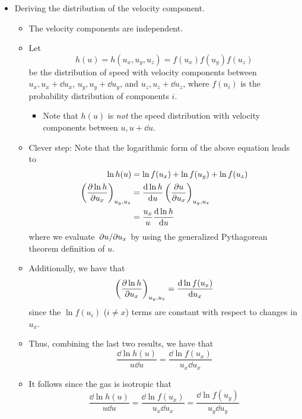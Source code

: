 \documentclass[../notes.tex]{subfiles}
\begin{document}
\begin{itemize}
    \item Deriving the distribution of the velocity component.
    \begin{itemize}
        \item The velocity components are independent.
        \item Let
        \begin{equation*}
            h(u) = h(u_x,u_y,u_z) = f(u_x)f(u_y)f(u_z)
        \end{equation*}
        be the distribution of speed with velocity components between $u_x,u_x+\dd{u_x}$, $u_y,u_y+\dd{u_y}$, and $u_z,u_z+\dd{u_z}$, where $f(u_i)$ is the probability distribution of components $i$.
        \begin{itemize}
            \item Note that $h(u)$ is \emph{not} the speed distribution with velocity components between $u,u+\dd{u}$.
        \end{itemize}
        \item Clever step: Note that the logarithmic form of the above equation leads to
        \begin{align*}
            \ln h(u) &= \ln f(u_x)+\ln f(u_y)+\ln f(u_z)\\
            \left( \pdv{\ln h}{u_x} \right)_{u_y,u_z} &= \dv{\ln h}{u}\left( \pdv{u}{u_x} \right)_{u_y,u_z}\\
            &= \frac{u_x}{u}\dv{\ln h}{u}
        \end{align*}
        where we evaluate $\pdv*{u}{u_x}$ by using the generalized Pythagorean theorem definition of $u$.
        \item Additionally, we have that
        \begin{equation*}
            \left( \pdv{\ln h}{u_x} \right)_{u_y,u_z} = \dv{\ln f(u_x)}{u_x}
        \end{equation*}
        since the $\ln f(u_i)$ ($i\neq x$) terms are constant with respect to changes in $u_x$.
        \item Thus, combining the last two results, we have that
        \begin{equation*}
            \frac{\dd{\ln h(u)}}{u\dd{u}} = \frac{\dd{\ln f(u_x)}}{u_x\dd{u_x}}
        \end{equation*}
        \item It follows since the gas is isotropic that
        \begin{equation*}
            \frac{\dd{\ln h(u)}}{u\dd{u}} = \frac{\dd{\ln f(u_x)}}{u_x\dd{u_x}}
            = \frac{\dd{\ln f(u_y)}}{u_y\dd{u_y}}

\end{equation*}
\end{itemize}
\end{itemize}
\end{document}
